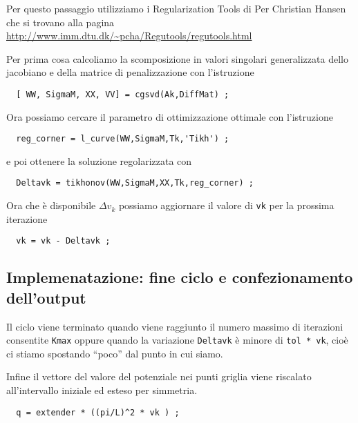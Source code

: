 \documentclass[a4paper,10pt]{article}
\theoremstyle{plain}
\theoremstyle{definition}
\theoremstyle{remark}
\begin{document}
Per questo passaggio utilizziamo i Regularization Tools di Per
Christian Hansen che si trovano alla pagina
\url{http://www.imm.dtu.dk/~pcha/Regutools/regutools.html}

Per prima cosa calcoliamo la scomposizione in valori singolari
generalizzata dello jacobiano e della matrice di penalizzazione con
l'istruzione
\begin{lstlisting}
  [ WW, SigmaM, XX, VV] = cgsvd(Ak,DiffMat) ;
\end{lstlisting}

Ora possiamo cercare il parametro di ottimizzazione ottimale con
l'istruzione
\begin{lstlisting}
  reg_corner = l_curve(WW,SigmaM,Tk,'Tikh') ;
\end{lstlisting}
e poi ottenere la soluzione regolarizzata con
\begin{lstlisting}
  Deltavk = tikhonov(WW,SigmaM,XX,Tk,reg_corner) ;
\end{lstlisting}

Ora che è disponibile $\Delta v_k$ possiamo aggiornare il valore di
\lstinline{vk} per la prossima iterazione
\begin{lstlisting}
  vk = vk - Deltavk ;
\end{lstlisting}

\subsection{Implemenatazione: fine ciclo e confezionamento dell'output}

Il ciclo viene terminato quando viene raggiunto il numero massimo di
iterazioni consentite \lstinline{Kmax} oppure quando la variazione
\lstinline{Deltavk} è minore di \lstinline{tol * vk}, cioè ci stiamo
spostando ``poco'' dal punto in cui siamo.

Infine il vettore del valore del potenziale nei punti griglia viene
riscalato all'intervallo iniziale ed esteso per simmetria.
\begin{lstlisting}
  q = extender * ((pi/L)^2 * vk ) ;
\end{lstlisting}
\end{document}
